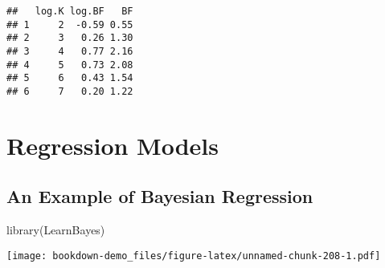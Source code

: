 \documentclass[
]{book}
\newenvironment{Shaded}{\begin{snugshade}}{\end{snugshade}}
\newcommand{\AttributeTok}[1]{\textcolor[rgb]{0.77,0.63,0.00}{#1}}
\newcommand{\DecValTok}[1]{\textcolor[rgb]{0.00,0.00,0.81}{#1}}
\newcommand{\FunctionTok}[1]{\textcolor[rgb]{0.00,0.00,0.00}{#1}}
\newcommand{\NormalTok}[1]{#1}
\newcommand{\OtherTok}[1]{\textcolor[rgb]{0.56,0.35,0.01}{#1}}
\newcommand{\SpecialCharTok}[1]{\textcolor[rgb]{0.00,0.00,0.00}{#1}}
\begin{document}
\begin{verbatim}
##   log.K log.BF   BF
## 1     2  -0.59 0.55
## 2     3   0.26 1.30
## 3     4   0.77 2.16
## 4     5   0.73 2.08
## 5     6   0.43 1.54
## 6     7   0.20 1.22
\end{verbatim}

\hypertarget{regression-models}{%
\chapter{Regression Models}\label{regression-models}}

\hypertarget{an-example-of-bayesian-regression}{%
\section{An Example of Bayesian Regression}\label{an-example-of-bayesian-regression}}

\begin{Shaded}
\begin{Highlighting}[]
\FunctionTok{library}\NormalTok{(LearnBayes)}
\end{Highlighting}
\end{Shaded}

\begin{Shaded}
\end{Shaded}

\texttt{[image: bookdown-demo\_files/figure-latex/unnamed-chunk-208-1.pdf]}

\begin{Shaded}
\end{Shaded}
\end{document}
